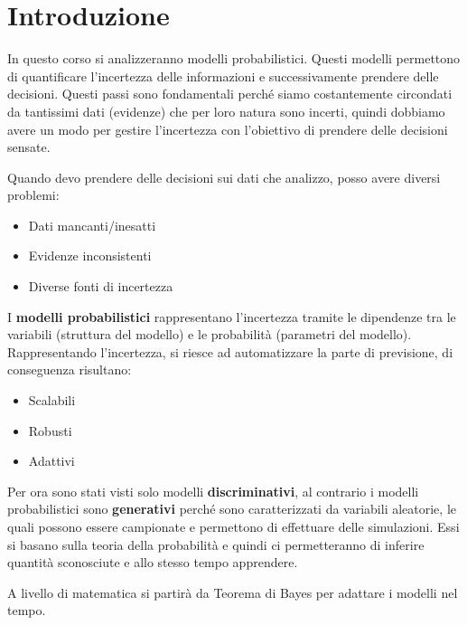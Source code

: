 \chapter{Introduzione}
In questo corso si analizzeranno modelli probabilistici. Questi modelli permettono
di quantificare l'incertezza delle informazioni e successivamente prendere delle
decisioni. Questi passi sono fondamentali perché siamo costantemente circondati
da tantissimi dati (evidenze) che per loro natura sono incerti, quindi dobbiamo
avere un modo per gestire l'incertezza con l'obiettivo di prendere delle
decisioni sensate.

Quando devo prendere delle decisioni sui dati che analizzo, posso avere diversi
problemi:
\begin{itemize}
    \item Dati mancanti/inesatti
    \item Evidenze inconsistenti
    \item Diverse fonti di incertezza
\end{itemize}
I \textbf{modelli probabilistici} rappresentano l'incertezza tramite le dipendenze
tra le variabili (struttura del modello) e le probabilità (parametri del modello).
Rappresentando l'incertezza, si riesce ad automatizzare la parte di previsione,
di conseguenza risultano:
\begin{itemize}
    \item Scalabili
    \item Robusti
    \item Adattivi
\end{itemize}

Per ora sono stati visti solo modelli \textbf{discriminativi}, al contrario i
modelli probabilistici sono \textbf{generativi} perché sono caratterizzati da
variabili aleatorie, le quali possono essere campionate e permettono di effettuare
delle simulazioni. Essi si basano sulla teoria della probabilità e quindi ci
permetteranno di inferire quantità sconosciute e allo stesso tempo apprendere.

A livello di matematica si partirà da Teorema di Bayes per adattare i modelli
nel tempo.

